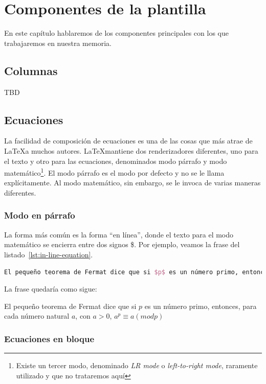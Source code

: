 \chapter{Componentes de la plantilla}
\label{ch:componentes-de-la-plantilla}

En este capítulo hablaremos de los componentes principales con los que trabajaremos en nuestra memoria.

\section{Columnas}

TBD

\section{Ecuaciones}

La facilidad de composición de ecuaciones es una de las cosas que más atrae de \LaTeX\space a muchos autores. \LaTeX mantiene dos renderizadores diferentes, uno para el texto y otro para las ecuaciones, denominados modo párrafo y modo matemático\footnote{Existe un tercer modo, denominado \textit{LR mode} o \textit{left-to-right mode}, raramente utilizado y que no trataremos aquí}. El modo párrafo es el modo por defecto y no se le llama explícitamente. Al modo matemático, sin embargo, se le invoca de varias maneras diferentes.

\subsection{Modo en párrafo}

La forma más común es la forma ``en línea'', donde el texto para el modo matemático se encierra entre dos signos \$. Por ejemplo, veamos la frase del listado~\ref{lst:in-line-equation}.

\begin{lstlisting}[language=tex,caption=Ejemplo de inserción de fórmulas en linea,label=lst:in-line-equation]
El pequeño teorema de Fermat dice que si $p$ es un número primo, entonces, para cada número natural $a$, con $a>0$, $a^p \equiv a (\mod p)$
\end{lstlisting}

La frase quedaría como sigue:

El pequeño teorema de Fermat dice que si $p$ es un número primo, entonces, para cada número natural $a$, con $a>0$, $a^p \equiv a (mod p)$

\subsection{Ecuaciones en bloque}

